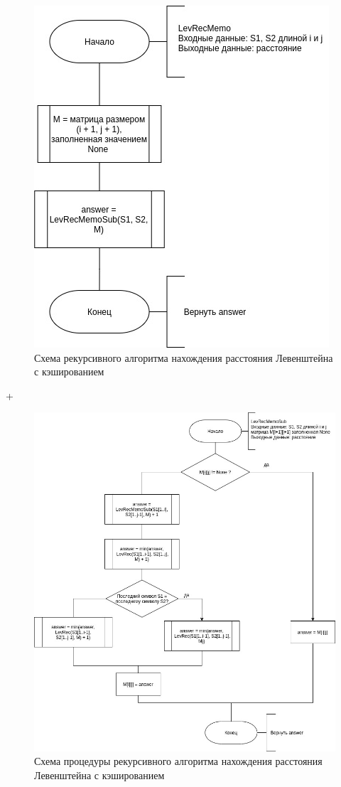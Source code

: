 \begin{figure}[h]
	\centering
	\includegraphics[scale=0.8]{schemes/LevRecMemo.jpg}
	\caption{Схема рекурсивного алгоритма нахождения расстояния Левенштейна с кэшированием}
	\label{scheme:levrecmemoutter}
\end{figure}
+

\begin{figure}[h]
	\centering
	\includegraphics[scale=0.56]{schemes/LevRecMemoSub.jpg}
	\caption{Схема процедуры рекурсивного алгоритма нахождения расстояния Левенштейна с кэшированием}
	\label{scheme:levrecmeminner}
\end{figure}


